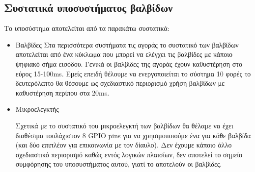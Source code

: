 \documentclass{article}
\begin{document}
\subsection{Συστατικά υποσυστήματος βαλβίδων}
Το υποσύστημα αποτελείται από τα παρακάτω συστατικά:
\begin{itemize}
    \item Βαλβίδες
    Στα περισσότερα συστήματα τις αγοράς το συστατικό των βαλβίδων αποτελείται από ένα κύκλωμα που μπορεί να ελέγχει τις βαλβίδες με κάποιο ψηφιακό σήμα εισόδου. Γενικά οι βαλβίδες της αγοράς έχουν καθυστέρηση στο εύρος 15-100ms. Εμείς επειδή θέλουμε να ενεργοποιείται το σύστημα 10 φορές το δευτερόλεπτο θα θέσουμε ως σχεδιαστικό περιορισμό χρήση βαλβίδων με καθυστέρηση περίπου στα 20ms.
    \item Μικροελεγκτής
    \par
    Σχετικά με το συστατικό του μικροελεγκτή των βαλβίδων θα θέλαμε να έχει διαθέσιμα τουλάχιστον 8 GPIO pins για να χρησιμοποιούμε ένα για κάθε βαλβίδα (και δύο επιπλέον για επικοινωνία με τον δίαυλο). Δεν έχουμε κάποιο άλλο σχεδιαστικό περιορισμό καθώς εντός λογικών πλαισίων, δεν αποτελεί το σημείο συμφόρησης του υποσυστήματος αυτού, γιατί το αποτελούν οι βαλβίδες.
\end{itemize}
\end{document}
